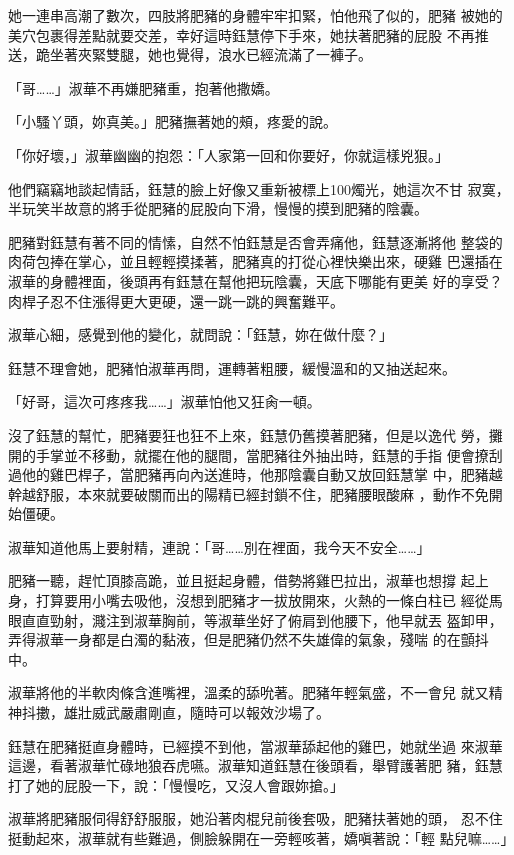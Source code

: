她一連串高潮了數次，四肢將肥豬的身體牢牢扣緊，怕他飛了似的，肥豬
被她的美穴包裹得差點就要交差，幸好這時鈺慧停下手來，她扶著肥豬的屁股
不再推送，跪坐著夾緊雙腿，她也覺得，浪水已經流滿了一褲子。

「哥……」淑華不再嫌肥豬重，抱著他撒嬌。

「小騷丫頭，妳真美。」肥豬撫著她的頰，疼愛的說。

「你好壞，」淑華幽幽的抱怨：「人家第一回和你要好，你就這樣兇狠。」

他們竊竊地談起情話，鈺慧的臉上好像又重新被標上100燭光，她這次不甘
寂寞，半玩笑半故意的將手從肥豬的屁股向下滑，慢慢的摸到肥豬的陰囊。

肥豬對鈺慧有著不同的情愫，自然不怕鈺慧是否會弄痛他，鈺慧逐漸將他
整袋的肉荷包捧在掌心，並且輕輕摸揉著，肥豬真的打從心裡快樂出來，硬雞
巴還插在淑華的身體裡面，後頭再有鈺慧在幫他把玩陰囊，天底下哪能有更美
好的享受？肉桿子忍不住漲得更大更硬，還一跳一跳的興奮難平。

淑華心細，感覺到他的變化，就問說：「鈺慧，妳在做什麼？」

鈺慧不理會她，肥豬怕淑華再問，運轉著粗腰，緩慢溫和的又抽送起來。

「好哥，這次可疼疼我……」淑華怕他又狂肏一頓。

沒了鈺慧的幫忙，肥豬要狂也狂不上來，鈺慧仍舊摸著肥豬，但是以逸代
勞，攤開的手掌並不移動，就擺在他的腿間，當肥豬往外抽出時，鈺慧的手指
便會撩刮過他的雞巴桿子，當肥豬再向內送進時，他那陰囊自動又放回鈺慧掌
中，肥豬越幹越舒服，本來就要破關而出的陽精已經封鎖不住，肥豬腰眼酸麻
，動作不免開始僵硬。

淑華知道他馬上要射精，連說：「哥……別在裡面，我今天不安全……」

肥豬一聽，趕忙頂膝高跪，並且挺起身體，借勢將雞巴拉出，淑華也想撐
起上身，打算要用小嘴去吸他，沒想到肥豬才一拔放開來，火熱的一條白柱已
經從馬眼直直勁射，濺注到淑華胸前，等淑華坐好了俯肩到他腰下，他早就丟
盔卸甲，弄得淑華一身都是白濁的黏液，但是肥豬仍然不失雄偉的氣象，殘喘
的在顫抖中。

淑華將他的半軟肉條含進嘴裡，溫柔的舔吮著。肥豬年輕氣盛，不一會兒
就又精神抖擻，雄壯威武嚴肅剛直，隨時可以報效沙場了。

鈺慧在肥豬挺直身體時，已經摸不到他，當淑華舔起他的雞巴，她就坐過
來淑華這邊，看著淑華忙碌地狼吞虎嚥。淑華知道鈺慧在後頭看，舉臂護著肥
豬，鈺慧打了她的屁股一下，說：「慢慢吃，又沒人會跟妳搶。」

淑華將肥豬服伺得舒舒服服，她沿著肉棍兒前後套吸，肥豬扶著她的頭，
忍不住挺動起來，淑華就有些難過，側臉躲開在一旁輕咳著，嬌嗔著說：「輕
點兒嘛……」

